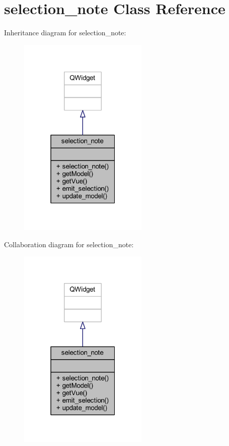 \hypertarget{classselection__note}{}\section{selection\+\_\+note Class Reference}
\label{classselection__note}


Inheritance diagram for selection\+\_\+note\+:
\nopagebreak
\begin{figure}[H]
\begin{center}
\leavevmode
\includegraphics[width=175pt]{classselection__note__inherit__graph}
\end{center}
\end{figure}


Collaboration diagram for selection\+\_\+note\+:
\nopagebreak
\begin{figure}[H]
\begin{center}
\leavevmode
\includegraphics[width=175pt]{classselection__note__coll__graph}
\end{center}
\end{figure}
